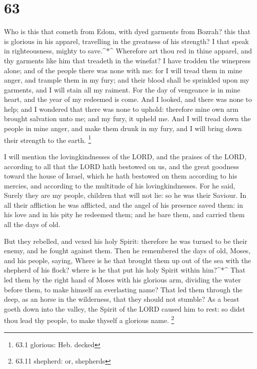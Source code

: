 \hypertarget{section-62}{%
\section{63}\label{section-62}}

 Who is this that cometh from Edom, with dyed garments from
Bozrah? this that is glorious in his apparel, travelling in the
greatness of his strength? I that speak in righteousness, mighty to
save.\^{}*\^{}  Wherefore art thou red in thine apparel, and
thy garments like him that treadeth in the winefat?  I have
trodden the winepress alone; and of the people there was none with me:
for I will tread them in mine anger, and trample them in my fury; and
their blood shall be sprinkled upon my garments, and I will stain all my
raiment.  For the day of vengeance is in mine heart, and the
year of my redeemed is come.  And I looked, and there was
none to help; and I wondered that there was none to uphold: therefore
mine own arm brought salvation unto me; and my fury, it upheld me.
 And I will tread down the people in mine anger, and make
them drunk in my fury, and I will bring down their strength to the
earth. \footnote{63.1 glorious: Heb. decked}

 I will mention the lovingkindnesses of the LORD, and the
praises of the LORD, according to all that the LORD hath bestowed on us,
and the great goodness toward the house of Israel, which he hath
bestowed on them according to his mercies, and according to the
multitude of his lovingkindnesses.  For he said, Surely they
are my people, children that will not lie: so he was their Saviour.
 In all their affliction he was afflicted, and the angel of
his presence saved them: in his love and in his pity he redeemed them;
and he bare them, and carried them all the days of old.

 But they rebelled, and vexed his holy Spirit: therefore he
was turned to be their enemy, and he fought against them. 
Then he remembered the days of old, Moses, and his people, saying, Where
is he that brought them up out of the sea with the shepherd of his
flock? where is he that put his holy Spirit within him?\^{}*\^{}
 That led them by the right hand of Moses with his glorious
arm, dividing the water before them, to make himself an everlasting
name?  That led them through the deep, as an horse in the
wilderness, that they should not stumble?  As a beast goeth
down into the valley, the Spirit of the LORD caused him to rest: so
didst thou lead thy people, to make thyself a glorious name. \footnote{63.11
  shepherd: or, shepherds}

